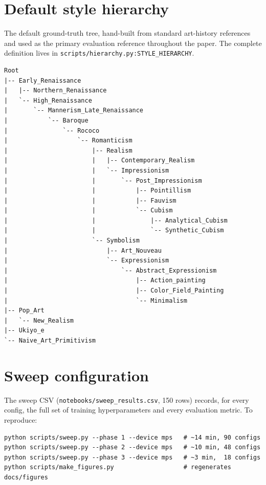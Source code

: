 \appendix

\section{Default style hierarchy}
\label{app:tree}

The default ground-truth tree, hand-built from standard art-history
references and used as the primary evaluation reference throughout the
paper. The complete definition lives in
\texttt{scripts/hierarchy.py:STYLE\_HIERARCHY}.

\begin{verbatim}
Root
|-- Early_Renaissance
|   |-- Northern_Renaissance
|   `-- High_Renaissance
|       `-- Mannerism_Late_Renaissance
|           `-- Baroque
|               `-- Rococo
|                   `-- Romanticism
|                       |-- Realism
|                       |   |-- Contemporary_Realism
|                       |   `-- Impressionism
|                       |       `-- Post_Impressionism
|                       |           |-- Pointillism
|                       |           |-- Fauvism
|                       |           `-- Cubism
|                       |               |-- Analytical_Cubism
|                       |               `-- Synthetic_Cubism
|                       `-- Symbolism
|                           |-- Art_Nouveau
|                           `-- Expressionism
|                               `-- Abstract_Expressionism
|                                   |-- Action_painting
|                                   |-- Color_Field_Painting
|                                   `-- Minimalism
|-- Pop_Art
|   `-- New_Realism
|-- Ukiyo_e
`-- Naive_Art_Primitivism
\end{verbatim}

\section{Sweep configuration}

The sweep CSV (\texttt{notebooks/sweep\_results.csv}, 150 rows) records,
for every config, the full set of training hyperparameters and every
evaluation metric. To reproduce:

\begin{verbatim}
python scripts/sweep.py --phase 1 --device mps   # ~14 min, 90 configs
python scripts/sweep.py --phase 2 --device mps   # ~10 min, 48 configs
python scripts/sweep.py --phase 3 --device mps   # ~3 min,  18 configs
python scripts/make_figures.py                   # regenerates docs/figures
\end{verbatim}
